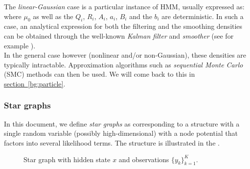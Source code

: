 The \emph{linear-Gaussian} case is a particular instance of HMM, usually expressed as:
where $\mu_0$ as well as the $Q_i$, $R_i$, $A_i$, $a_i$, $B_i$ and the $b_i$ are deterministic. In such a case, an analytical expression for both the filtering and the smoothing densities can be obtained through the well-known \emph{Kalman filter} and \emph{smoother} (see for example \citet{anderson79}). \\

In the general case however (nonlinear and/or non-Gaussian), these densities are typically intractable. Approximation algorithms such as \emph{sequential Monte Carlo} (SMC) methods can then be used. We will come back to this in \hyperref[bg:particle]{section~\ref*{bg:particle}}. 

\subsubsection{Star graphs}

In this document, we define \emph{star graphs} as corresponding to a structure with a single random variable (possibly high-dimensional) with a node potential that factors into several likelihood terms. The structure is illustrated in the . 

\begin{figure}[!h]
\center
{}
\caption{\label{fig:star1} Star graph with hidden state $x$ and observations $\{y_k\}_{k=1}^{K}$. }
\end{figure} 

